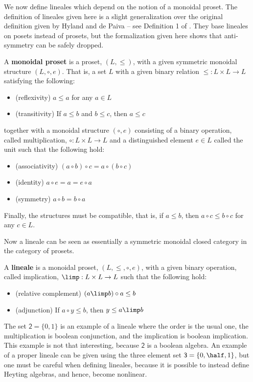 We now define lineales which depend on the notion of a monoidal
proset.  The definition of lineales given here is a slight
generalization over the original definition given by Hyland and de
Paiva -- see Definition 1 of \cite{Hyland:1991}.  They base lineales
on posets instead of prosets, but the formalization given here shows
that anti-symmetry can be safely dropped.
\begin{definition}
  \label{def:monoidal-proset}
  A \textbf{monoidal proset} is a proset, $(L, \leq)$, with a given
  symmetric monoidal structure $(L, \circ, e)$.  That is, a set $L$
  with a given binary relation $\leq : L \times L \to L$ satisfying
  the following:
  \begin{itemize}
  \item (reflexivity) $a \leq a$ for any $a \in L$
  \item (transitivity) If $a \leq b$ and $b \leq c$, then $a \leq c$
  \end{itemize}
  together with a monoidal structure $(\circ, e)$ consisting of a
  binary operation, called multiplication, $\circ : L \times L \to L$
  and a distinguished element $e \in L$ called the unit such that the
  following hold:
  \begin{itemize}
  \item (associativity) $(a \circ b) \circ c = a \circ (b \circ c)$
  \item (identity) $a \circ e = a = e \circ a$
  \item (symmetry) $a \circ b = b \circ a$
  \end{itemize}
  Finally, the structures must be compatible, that is, if $a \leq b$,
  then $a \circ c \leq b \circ c$ for any $c \in L$.
\end{definition}
Now a lineale can be seen as essentially a symmetric monoidal closed
category in the category of prosets.
\begin{definition}
  \label{def:lineale}
  A \textbf{lineale} is a monoidal proset, $(L, \leq, \circ, e)$, with
  a given binary operation, called implication, $\limp : L \times L
  \to L$ such that the following hold:
  \begin{itemize}
  \item (relative complement) $(a \limp b) \circ a \leq b$ 
  \item (adjunction) If $a \circ y \leq b$, then $y \leq a \limp b$
  \end{itemize}
\end{definition}
The set $\mathsf{2} = \{0,1\}$ is an example of a lineale where the
order is the usual one, the multiplication is boolean conjunction, and
the implication is boolean implication.  This example is not that
interesting, because $\mathsf{2}$ is a boolean algebra.  An example of
a proper lineale can be given using the three element set
$\mathsf{3} = \{0,\half, 1\}$, but one must be careful when
defining lineales, because it is possible to instead define Heyting
algebras, and hence, become nonlinear.

